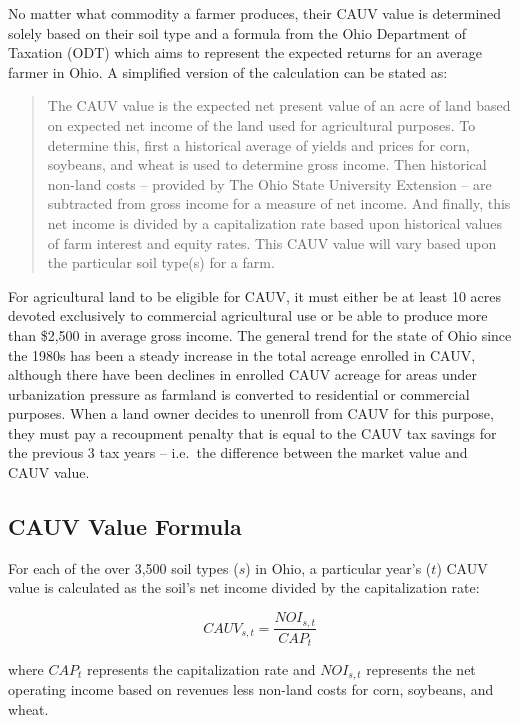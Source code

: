 \documentclass[]{article}
\begin{document}
No matter what commodity a farmer produces, their CAUV value is
determined solely based on their soil type and a formula from the Ohio
Department of Taxation (ODT) which aims to represent the expected
returns for an average farmer in Ohio. A simplified version of the
calculation can be stated as:

\begin{quote}
The CAUV value is the expected net present value of an acre of land
based on expected net income of the land used for agricultural purposes.
To determine this, first a historical average of yields and prices for
corn, soybeans, and wheat is used to determine gross income. Then
historical non-land costs -- provided by The Ohio State University
Extension -- are subtracted from gross income for a measure of net
income. And finally, this net income is divided by a capitalization rate
based upon historical values of farm interest and equity rates. This
CAUV value will vary based upon the particular soil type(s) for a farm.
\end{quote}

For agricultural land to be eligible for CAUV, it must either be at
least 10 acres devoted exclusively to commercial agricultural use or be
able to produce more than \$2,500 in average gross income. The general
trend for the state of Ohio since the 1980s has been a steady increase
in the total acreage enrolled in CAUV, although there have been declines
in enrolled CAUV acreage for areas under urbanization pressure as
farmland is converted to residential or commercial purposes. When a land
owner decides to unenroll from CAUV for this purpose, they must pay a
recoupment penalty that is equal to the CAUV tax savings for the
previous 3 tax years -- i.e.~the difference between the market value and
CAUV value.

\hypertarget{cauv-value-formula}{%
\subsection{CAUV Value Formula}\label{cauv-value-formula}}

For each of the over 3,500 soil types (\(s\)) in Ohio, a particular
year's (\(t\)) CAUV value is calculated as the soil's net income divided
by the capitalization rate:

\[
CAUV_{s,t} = \frac{NOI_{s,t}}{CAP_t} \label{eq:cauv}
\]

where \(CAP_t\) represents the capitalization rate and \(NOI_{s,t}\)
represents the net operating income based on revenues less non-land
costs for corn, soybeans, and wheat.
\end{document}
